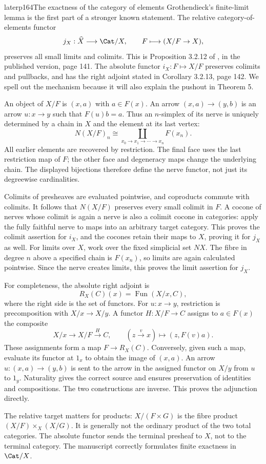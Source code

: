 \begin{dcomment}{later}{p164}{The exactness of the category of elements}
Grothendieck's finite-limit lemma is the first part of a stronger known statement. The relative category-of-elements functor
\[
             j_X:\widehat X\longrightarrow\Cat/X,
             \qquad F\longmapsto (X/F\to X),
\]
preserves all small limits and colimits. This is Proposition 3.2.12 of \citet{Cisinski2006}, in the published version, page 141. The absolute functor $i_X:F\mapsto X/F$ preserves colimits and pullbacks, and has the right adjoint stated in Corollary 3.2.13, page 142. We spell out the mechanism because it will also explain the pushout in Theorem 5.

An object of $X/F$ is $(x,a)$ with $a\in F(x)$. An arrow $(x,a)\to(y,b)$ is an arrow $u:x\to y$ such that $F(u)b=a$. Thus an $n$-simplex of its nerve is uniquely determined by a chain in $X$ and the element at its last vertex:
\[
 N(X/F)_n\cong
       \coprod_{x_0\to x_1\to\cdots\to x_n} F(x_n).
\]
All earlier elements are recovered by restriction. The final face uses the last restriction map of $F$; the other face and degeneracy maps change the underlying chain. The displayed bijections therefore define the nerve functor, not just its degreewise cardinalities.

Colimits of presheaves are evaluated pointwise, and coproducts commute with colimits. It follows that $N(X/F)$ preserves every small colimit in $F$. A cocone of nerves whose colimit is again a nerve is also a colimit cocone in categories: apply the fully faithful nerve to maps into an arbitrary target category. This proves the colimit assertion for $i_X$, and the cocones retain their maps to $X$, proving it for $j_X$ as well. For limits over $X$, work over the fixed simplicial set $NX$. The fibre in degree $n$ above a specified chain is $F(x_n)$, so limits are again calculated pointwise. Since the nerve creates limits, this proves the limit assertion for $j_X$.

For completeness, the absolute right adjoint is
\[
       R_X(C)(x)=\operatorname{Fun}(X/x,C),
\]
where the right side is the set of functors. For $u:x\to y$, restriction is precomposition with $X/x\to X/y$. A functor $H:X/F\to C$ assigns to $a\in F(x)$ the composite
\[
 X/x\longrightarrow X/F\xrightarrow{H}C,
 \qquad (z\xrightarrow{v}x)\longmapsto(z,F(v)a).
\]
These assignments form a map $F\to R_X(C)$. Conversely, given such a map, evaluate its functor at $1_x$ to obtain the image of $(x,a)$. An arrow $u:(x,a)\to(y,b)$ is sent to the arrow in the assigned functor on $X/y$ from $u$ to $1_y$. Naturality gives the correct source and ensures preservation of identities and compositions. The two constructions are inverse. This proves the adjunction directly.

The relative target matters for products: $X/(F\times G)$ is the fibre product $(X/F)\times_X(X/G)$. It is generally not the ordinary product of the two total categories. The absolute functor sends the terminal presheaf to $X$, not to the terminal category. The manuscript correctly formulates finite exactness in $\Cat/X$.
\end{dcomment}

